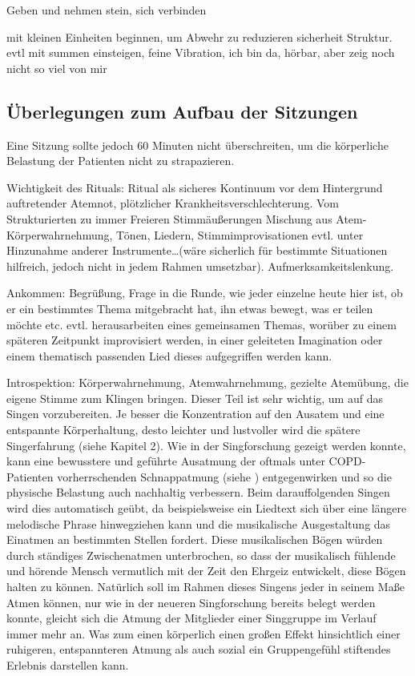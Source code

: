 Geben und nehmen stein, sich verbinden

mit kleinen Einheiten beginnen, um Abwehr zu reduzieren sicherheit Struktur. evtl mit summen einsteigen, feine Vibration, ich bin da, hörbar, aber zeig noch nicht so viel von mir


\subsection{Überlegungen zum Aufbau der Sitzungen}

Eine Sitzung sollte jedoch 60 Minuten nicht überschreiten, um die körperliche Belastung der Patienten nicht zu strapazieren.

Wichtigkeit des Rituals: Ritual als sicheres Kontinuum vor dem Hintergrund auftretender Atemnot, plötzlicher Krankheitsverschlechterung. 
Vom Strukturierten zu immer Freieren Stimmäußerungen
Mischung aus Atem- Körperwahrnehmung, Tönen, Liedern, Stimmimprovisationen evtl. unter Hinzunahme anderer Instrumente…(wäre sicherlich für bestimmte Situationen hilfreich, jedoch nicht in jedem Rahmen umsetzbar). 
Aufmerksamkeitslenkung. 

Ankommen: 
Begrüßung, Frage in die Runde, wie jeder einzelne heute hier ist, ob er ein bestimmtes Thema mitgebracht hat, ihn etwas bewegt, was er teilen möchte etc. evtl. herausarbeiten eines gemeinsamen Themas, worüber zu einem späteren Zeitpunkt improvisiert werden, in einer geleiteten Imagination oder einem thematisch passenden Lied dieses aufgegriffen werden kann.

Introspektion: 
Körperwahrnehmung, Atemwahrnehmung, gezielte Atemübung, die eigene Stimme zum Klingen bringen. Dieser Teil ist sehr wichtig, um auf das Singen vorzubereiten. Je besser die Konzentration auf den Ausatem und eine entspannte Körperhaltung, desto leichter und lustvoller wird die spätere Singerfahrung (siehe Kapitel 2). Wie in der Singforschung gezeigt werden konnte, kann eine bewusstere und geführte Ausatmung der oftmals unter COPD-Patienten vorherrschenden Schnappatmung (siehe \label{copd}) entgegenwirken und so die physische Belastung auch nachhaltig verbessern. Beim darauffolgenden Singen wird dies automatisch geübt, da beispielsweise ein Liedtext sich über eine längere melodische Phrase hinwegziehen kann und die musikalische Ausgestaltung das Einatmen an bestimmten Stellen fordert. Diese musikalischen Bögen würden durch ständiges Zwischenatmen unterbrochen, so dass der musikalisch fühlende und hörende Mensch vermutlich mit der Zeit den Ehrgeiz entwickelt, diese Bögen halten zu können. Natürlich soll im Rahmen dieses Singens jeder in seinem Maße Atmen können, nur wie in der neueren Singforschung bereits belegt werden konnte, gleicht sich die Atmung der Mitglieder einer Singgruppe im Verlauf immer mehr an. Was zum einen körperlich einen großen Effekt hinsichtlich einer ruhigeren, entspannteren Atmung als auch sozial ein Gruppengefühl stiftendes Erlebnis darstellen kann.

